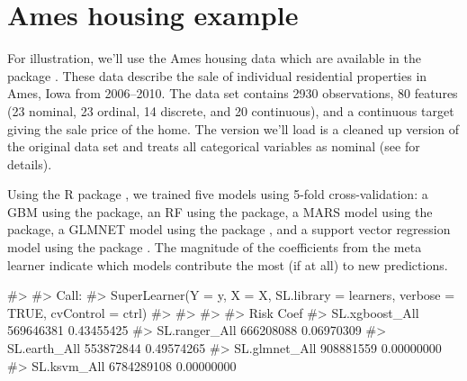 \section{Ames housing example}

For illustration, we'll use the Ames housing data \citep{ames-cock-2011}
which are available in the  package
\citep{R-AmesHousing}. These data describe the sale of individual
residential properties in Ames, Iowa from 2006--2010. The data set
contains 2930 observations, 80 features (23 nominal, 23 ordinal, 14
discrete, and 20 continuous), and a continuous target giving the sale
price of the home. The version we'll load is a cleaned up version of the
original data set and treats all categorical variables as nominal (see
 for details).

Using the R package  \citep{R-SuperLearner}, we
trained five models using 5-fold cross-validation: a GBM using the
 package, an RF using the  package, a MARS
model using the  package, a GLMNET model using the
 package \citep{R-glmnet}, and a support vector
regression model using the  package \citep{R-kernlab}.
The magnitude of the coefficients from the meta learner indicate which
models contribute the most (if at all) to new predictions.

\begin{Schunk}
\begin{Soutput}
#>
#> Call:
#> SuperLearner(Y = y, X = X, SL.library = learners, verbose = TRUE, cvControl = ctrl)
#>
#>
#>
#>                      Risk       Coef
#> SL.xgboost_All  569646381 0.43455425
#> SL.ranger_All   666208088 0.06970309
#> SL.earth_All    553872844 0.49574265
#> SL.glmnet_All   908881559 0.00000000
#> SL.ksvm_All    6784289108 0.00000000
\end{Soutput}
\end{Schunk}

